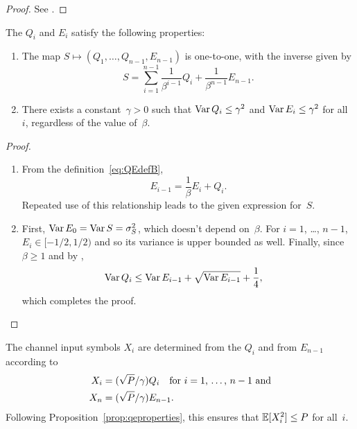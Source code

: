 \begin{proof}
  See .
\end{proof}

\begin{proposition}
  \label{prop:qeproperties}
  The $Q_i$ and $E_i$ satisfy the following properties:
\begin{enumerate}
  \item The map $S \mapsto (Q_1, \dots, Q_{n-1}, E_{n-1})$ is one-to-one, with
    the inverse given by
    \begin{equation}
      \label{eq:unwraprec}
      S = \sum_{i=1}^{n-1} \frac{1}{\beta^{i-1}} Q_i + \frac{1}{\beta^{n-1}}
      E_{n-1}.
    \end{equation}

  \item There exists a constant~$\gamma > 0$ such that $\operatorname{Var} Q_i \le \gamma^2$
    and $\operatorname{Var} E_i \le \gamma^2$ for all~$i$, regardless of the value of~$\beta$.
\end{enumerate}
\end{proposition}

\begin{proof}
  \begin{enumerate}
    \item From the definition~\eqref{eq:QEdefB}, 
    \begin{equation}
      \label{eq:reverserec}
      E_{i-1} = \frac{1}{\beta} E_i + Q_i.
    \end{equation}
    Repeated use of this relationship leads to the given expression for~$S$. 

  \item First, $\operatorname{Var} E_0 = \operatorname{Var} S = {\sigma_S^2}$, which doesn't depend
    on~$\beta$. For $i = 1$, \ldots, $n-1$, $E_i \in [-1/2, 1/2)$ and so its
    variance is upper bounded as well. Finally, since $\beta \ge 1$ and by
    , 
    \begin{align*}
      \operatorname{Var} Q_i &\le \operatorname{Var} E_{i-1} + \sqrt{\operatorname{Var} E_{i-1}} + \frac14,
    \end{align*}
    which completes the proof.
  \end{enumerate}
\end{proof}

The channel input symbols $X_i$ are determined from the $Q_i$ and from $E_{n-1}$
according to 
\begin{align}
  X_i &= (\sqrt{P}/\gamma) Q_i \quad
  \text{for $i = 1$, \dots, $n-1$ and} \nonumber\\
  X_n &= (\sqrt{P}/\gamma) E_{n-1}.
  \label{eq:Xdef}
\end{align}
Following Proposition~\ref{prop:qeproperties}, this ensures that $\mathbb{E}[X_i^2] \le
P$ for all~$i$. 

